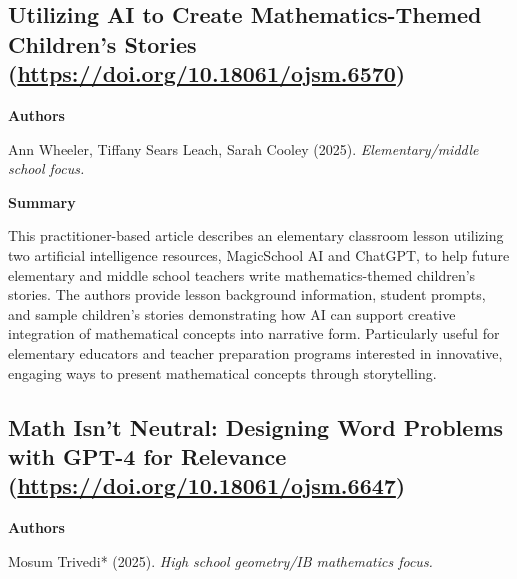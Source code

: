 \documentclass[11pt, a4paper]{article}
\newenvironment{annotation}[1]
{\par\vspace{2pt}\noindent\textbf{#1}\par\vspace{1pt}\noindent\small\ignorespaces}
{\par\vspace{3pt}}
\begin{document}
\subsection[\texorpdfstring{Utilizing AI to Create Mathematics-Themed Children's Stories }{Utilizing AI to Create Mathematics-Themed Children's Stories }]{Utilizing AI to Create Mathematics-Themed Children's Stories (\texorpdfstring{\url{https://doi.org/10.18061/ojsm.6570}}{})}

\begin{annotation}{Authors}
Ann Wheeler, Tiffany Sears Leach, Sarah Cooley (2025). \textit{Elementary/middle school focus.}
\end{annotation}

\begin{annotation}{Summary}
This practitioner-based article describes an elementary classroom lesson utilizing two artificial intelligence resources, MagicSchool AI and ChatGPT, to help future elementary and middle school teachers write mathematics-themed children's stories. The authors provide lesson background information, student prompts, and sample children's stories demonstrating how AI can support creative integration of mathematical concepts into narrative form. Particularly useful for elementary educators and teacher preparation programs interested in innovative, engaging ways to present mathematical concepts through storytelling.
\end{annotation}


\subsection[\texorpdfstring{Math Isn't Neutral: Designing Word Problems with GPT-4 for Relevance }{Math Isn't Neutral: Designing Word Problems with GPT-4 for Relevance }]{Math Isn't Neutral: Designing Word Problems with GPT-4 for Relevance (\texorpdfstring{\url{https://doi.org/10.18061/ojsm.6647}}{})}

\begin{annotation}{Authors}
Mosum Trivedi* (2025). \textit{High school geometry/IB mathematics focus.}
\end{annotation}
\end{document}

